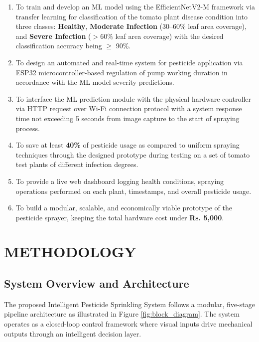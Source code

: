 \documentclass[12pt,a4paper,oneside]{report}
\begin{document}
\begin{enumerate}[leftmargin=2em, label=\textbf{O\arabic*.}]
    \item To train and develop an ML model using the EfficientNetV2-M framework via transfer learning for classification of the tomato plant disease condition into three classes: \textbf{Healthy}, \textbf{Moderate Infection} (30–60\% leaf area coverage), and \textbf{Severe Infection} ($>$60\% leaf area coverage) with the desired classification accuracy being $\geq$ 90\%.

    \item To design an automated and real-time system for pesticide application via ESP32 microcontroller-based regulation of pump working duration in accordance with the ML model severity predictions.

    \item To interface the ML prediction module with the physical hardware controller via HTTP request over Wi-Fi connection protocol with a system response time not exceeding 5 seconds from image capture to the start of spraying process.

    \item To save at least \textbf{40\%} of pesticide usage as compared to uniform spraying techniques through the designed prototype during testing on a set of tomato test plants of different infection degrees.

    \item To provide a live web dashboard logging health conditions, spraying operations performed on each plant, timestamps, and overall pesticide usage.

    \item To build a modular, scalable, and economically viable prototype of the pesticide sprayer, keeping the total hardware cost under \textbf{Rs. 5,000}.
\end{enumerate}

\chapter{METHODOLOGY}

\section{System Overview and Architecture}

The proposed Intelligent Pesticide Sprinkling System follows a modular, five-stage pipeline architecture as illustrated in Figure \ref{fig:block_diagram}. The system operates as a closed-loop control framework where visual inputs drive mechanical outputs through an intelligent decision layer.
\end{document}
